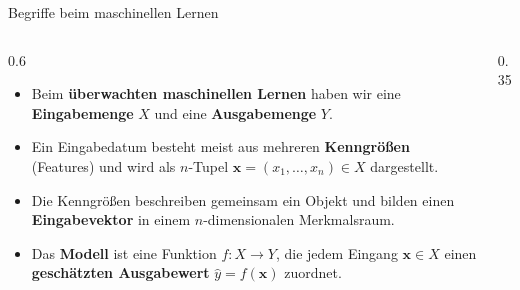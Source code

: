 \begin{frame}{Begriffe beim maschinellen Lernen}
  \begin{columns}
    \begin{column}{0.6\linewidth}
      \begin{itemize}
        \item Beim \textbf{überwachten maschinellen Lernen} haben wir eine \textbf{Eingabemenge} \(X\)
              und eine \textbf{Ausgabemenge} \(Y\).
        \item Ein Eingabedatum besteht meist aus mehreren \textbf{Kenngrößen} (Features) und wird als
              \(n\)-Tupel \(\mathbf{x} = (x_1,\dots,x_n) \in X\) dargestellt.
        \item Die Kenngrößen beschreiben gemeinsam ein Objekt und bilden einen \textbf{Eingabevektor}
              in einem \(n\)-dimensionalen Merkmalsraum.
        \item Das \textbf{Modell} ist eine Funktion \(f : X \rightarrow Y\), die jedem Eingang
              \(\mathbf{x} \in X\) einen \textbf{geschätzten Ausgabewert} \(\hat{y} = f(\mathbf{x})\) zuordnet.
      \end{itemize}

      \vfill
    \end{column}
    \begin{column}{0.35\linewidth}
      \centering
      
    \end{column}
  \end{columns}
\end{frame}

